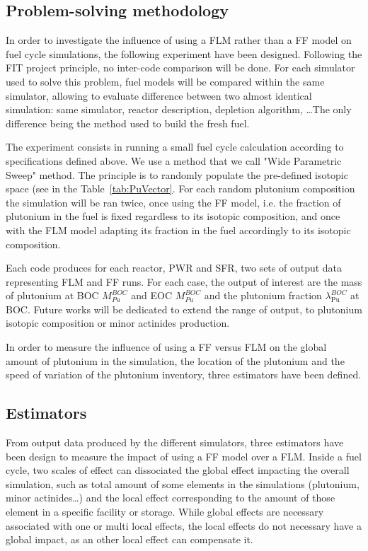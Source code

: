 \subsection{Problem-solving methodology}

In order to investigate the influence of using a \gls{FLM} rather than a
\gls{FF} model on fuel cycle simulations, the following experiment have been
designed. Following the FIT project principle, no inter-code comparison will be
done. For each simulator used to solve this problem, fuel models will be
compared within the same simulator, allowing to evaluate difference between two
almost identical simulation: same simulator, reactor description, depletion
algorithm, \ldots The only difference being the method used to build the fresh fuel.

The experiment consists in running a small fuel cycle calculation according to
specifications defined above. We use a method that we call "Wide Parametric
Sweep" method. The principle is to randomly populate the pre-defined isotopic
space (see in the Table~\ref{tab:PuVector}. For each random plutonium
composition the simulation will be ran twice, once using the \gls{FF} model,
i.e. the fraction of plutonium in the fuel is fixed regardless to its isotopic
composition, and once with the \gls{FLM} model adapting its fraction in the fuel
accordingly to its isotopic composition. 

Each code produces for each reactor, \gls{PWR} and \gls{SFR}, two sets of output
data representing \gls{FLM} and \gls{FF} runs. For each case, the output of
interest are the mass of plutonium at \gls{BOC} $M_{Pu}^{BOC}$ and \gls{EOC}
$M_{Pu}^{BOC}$ and the plutonium fraction $\lambda_{\mathrm{Pu}}^{BOC}$ at
\gls{BOC}. Future works will be dedicated to extend the range of output, to
plutonium isotopic composition or minor actinides production. 

In order to measure the influence of using a \gls{FF} versus \gls{FLM} on the
global amount of plutonium in the simulation, the location of the plutonium and
the speed of variation of the plutonium inventory, three estimators have been
defined.


\subsection{Estimators\label{subsec:estimator}}

From output data produced by the different simulators, three estimators have
been design to measure the impact of using a \gls{FF} model over a \gls{FLM}.
Inside a fuel cycle, two scales of effect can dissociated the global effect impacting
the overall simulation, such as total amount of some elements in the simulations
(plutonium, minor actinides\ldots) and the local effect corresponding to the
amount of those element in a specific facility or storage. While global effects
are necessary associated with one or multi local effects, the local effects do
not necessary have a global impact, as an other local effect can compensate it.


